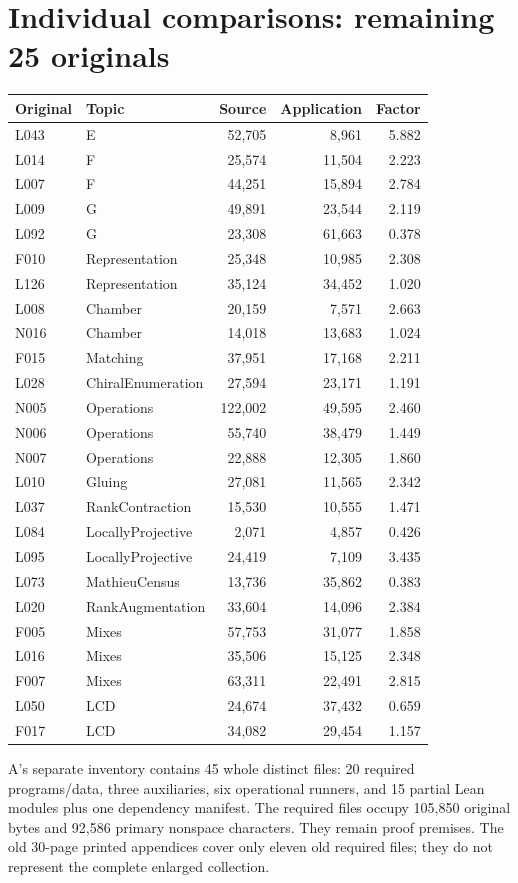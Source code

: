 \documentclass[11pt,a4paper]{article}
\begin{document}
\section*{Individual comparisons: remaining 25 originals}
\begin{center}\small\begin{tabular}{llrrr}\toprule
Original & Topic & Source & Application & Factor\\\midrule
L043 & E & 52,705 & 8,961 & 5.882 \\
L014 & F & 25,574 & 11,504 & 2.223 \\
L007 & F & 44,251 & 15,894 & 2.784 \\
L009 & G & 49,891 & 23,544 & 2.119 \\
L092 & G & 23,308 & 61,663 & 0.378 \\
F010 & Representation & 25,348 & 10,985 & 2.308 \\
L126 & Representation & 35,124 & 34,452 & 1.020 \\
L008 & Chamber & 20,159 & 7,571 & 2.663 \\
N016 & Chamber & 14,018 & 13,683 & 1.024 \\
F015 & Matching & 37,951 & 17,168 & 2.211 \\
L028 & ChiralEnumeration & 27,594 & 23,171 & 1.191 \\
N005 & Operations & 122,002 & 49,595 & 2.460 \\
N006 & Operations & 55,740 & 38,479 & 1.449 \\
N007 & Operations & 22,888 & 12,305 & 1.860 \\
L010 & Gluing & 27,081 & 11,565 & 2.342 \\
L037 & RankContraction & 15,530 & 10,555 & 1.471 \\
L084 & LocallyProjective & 2,071 & 4,857 & 0.426 \\
L095 & LocallyProjective & 24,419 & 7,109 & 3.435 \\
L073 & MathieuCensus & 13,736 & 35,862 & 0.383 \\
L020 & RankAugmentation & 33,604 & 14,096 & 2.384 \\
F005 & Mixes & 57,753 & 31,077 & 1.858 \\
L016 & Mixes & 35,506 & 15,125 & 2.348 \\
F007 & Mixes & 63,311 & 22,491 & 2.815 \\
L050 & LCD & 24,674 & 37,432 & 0.659 \\
F017 & LCD & 34,082 & 29,454 & 1.157 \\\bottomrule\end{tabular}\end{center}
A's separate inventory contains 45 whole distinct files: 20 required programs/data, three auxiliaries, six operational runners, and 15 partial Lean modules plus one dependency manifest. The required files occupy 105,850 original bytes and 92,586 primary nonspace characters. They remain proof premises. The old 30-page printed appendices cover only eleven old required files; they do not represent the complete enlarged collection.
\end{document}
